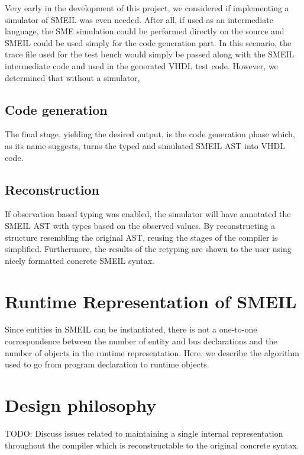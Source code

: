 Very early in the development of this project, we considered if implementing a
simulator of SMEIL was even needed. After all, if used as an intermediate
language, the SME simulation could be performed directly on the source and SMEIL
could be used simply for the code generation part. In this scenario, the trace
file used for the test bench would simply be passed along with the SMEIL
intermediate code and used in the generated VHDL test code. However, we
determined that without a simulator, 

\subsection{Code generation}
The final stage, yielding the desired output, is the code generation phase
which, as its name suggests, turns the typed and simulated SMEIL AST into VHDL
code.
\subsection{Reconstruction} If observation based typing was enabled, the
simulator will have annotated the SMEIL AST with types based on the observed
values. By reconstructing a structure resembling the original AST, reusing the
stages of the compiler is simplified. Furthermore, the results of the retyping
are shown to the user using nicely formatted concrete SMEIL syntax.

\section{Runtime Representation of SMEIL}
Since entities in SMEIL can be instantiated, there is not a one-to-one
correspondence between the number of entity and bus declarations and the number
of objects in the runtime representation. Here, we describe the algorithm used
to go from program declaration to runtime objects. 



\section{Design philosophy}
TODO: Discuss issues related to maintaining a single internal representation
throughout the compiler which is reconstructable to the original concrete
syntax.



